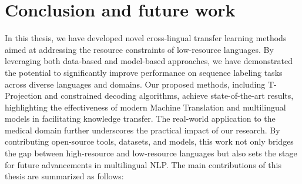 \chapter[Conclusion and future work]{Conclusion and future work}
\label{ch:final-chapter}

In this thesis, we have developed novel cross-lingual transfer learning methods aimed at addressing the resource constraints of low-resource languages. By leveraging both data-based and model-based approaches, we have demonstrated the potential to significantly improve performance on sequence labeling tasks across diverse languages and domains. Our proposed methods, including T-Projection and constrained decoding algorithms, achieve state-of-the-art results, highlighting the effectiveness of modern Machine Translation and multilingual models in facilitating knowledge transfer. The real-world application to the medical domain further underscores the practical impact of our research. By contributing open-source tools, datasets, and models, this work not only bridges the gap between high-resource and low-resource languages but also sets the stage for future advancements in multilingual NLP. The main contributions of this thesis are summarized as follows:


